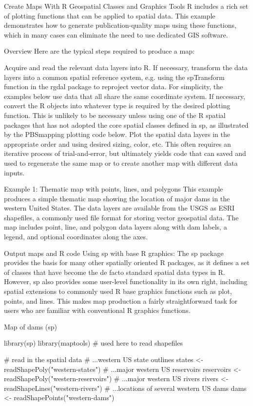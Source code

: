Create Maps With R Geospatial Classes and Graphics Tools
R includes a rich set of plotting functions that can be applied to spatial data. This example demonstrates how to generate publication-quality maps using these functions, which in many cases can eliminate the need to use dedicated GIS software.

Overview
Here are the typical steps required to produce a map:

Acquire and read the relevant data layers into R.
If necessary, transform the data layers into a common spatial reference system, e.g. using the spTransform function in the rgdal package to reproject vector data. For simplicity, the examples below use data that all share the same coordinate system.
If necessary, convert the R objects into whatever type is required by the desired plotting function. This is unlikely to be necessary unless using one of the R spatial packages that has not adopted the core spatial classes defined in sp, as illustrated by the PBSmapping plotting code below.
Plot the spatial data layers in the appropriate order and using desired sizing, color, etc. This often requires an iterative process of trial-and-error, but ultimately yields code that can saved and used to regenerate the same map or to create another map with different data inputs.


Example 1: Thematic map with points, lines, and polygons
This example produces a simple thematic map showing the location of major dams in the western United States. The data layers are available from the USGS as ESRI shapefiles, a commonly used file format for storing vector geospatial data. The map includes point, line, and polygon data layers along with dam labels, a legend, and optional coordinates along the axes.

Output maps and R code
Using sp with base R graphics:
The sp package provides the basis for many other spatially oriented R packages, as it defines a set of classes that have become the de facto standard spatial data types in R. However, sp also provides some user-level functionality in its own right, including spatial extensions to commonly used R base graphics functions such as plot, points, and lines. This makes map production a fairly straightforward task for users who are familiar with conventional R graphics functions.

Map of dams (sp)

library(sp)
library(maptools) # used here to read shapefiles
 
# read in the spatial data
# ...western US state outlines
states <- readShapePoly("western-states")
# ...major western US reservoirs
reservoirs <- readShapePoly("western-reservoirs")
# ...major western US rivers
rivers <- readShapeLines("western-rivers")
# ...locations of several western US dams
dams <- readShapePoints("western-dams")
 
